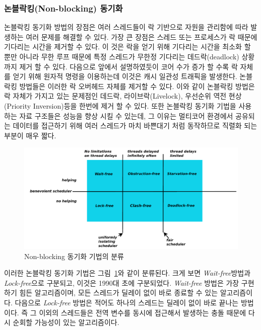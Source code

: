 \subsubsection{논블락킹(Non-blocking) 동기화}

논블락킹 동기화 방법의 장점은 여러 스레드들이 락 기반으로 자원을 관리함에 따라 
발생하는 여러 문제를 해결할 수 있다.
가장 큰 장점은 스레드 또는 프로세스가 락 때문에 기다리는 시간을 제거할 수 있다.
이 것은 락을 얻기 위해 기다리는 시간을 최소화 할 뿐만 아니라 무한 루프 때문에 특정 스레드가 무한정 기다리는 
데드락(deadlock) 상황까지 제거 할 수 있다. 
다음으로 앞에서 설명하였듯이 코어 수가 증가 할 수록 락 자체를 얻기 위해 원자적 명령을 이용하는데 이것은 
캐시 일관성 트래픽을 발생한다. 
논블락킹 방법들은 이러한 락 오버헤드 자체를 제거할 수 있다. 
이와 같이 논블락킹 방법은 락 자체가 가지고 있는 문제점인 데드락, 라이브락(Livelock), 
우선순위 역전 현상(Priority Inversion)등을 한번에 제거 할 수 있다. 
또한 논블락킹 동기화 기법을 사용하는  자료 구조들은 성능을 향상 시킬 수 있는데, 
그 이유는 멀티코어 환경에서 공유되는 데이터를 접근하기 위해 여러 스레드가 마치 바쁜대기 처럼 동작하므로 
직렬화 되는 부분이 매우 짧다.

\begin{figure}[h!]
    \centering
    \includegraphics[width=1\textwidth]{fig/NBS/NBS}
    \caption{Non-blocking 동기화 기법의 분류}
  \label{fig:NBS}
\end{figure}


이러한 논블락킹 동기화 기법은 그림~\ref{fig:NBS}와 같이 분류된다.
크게 보면 \textit{Wait-free}방법과 \textit{Lock-free}으로 구분되고, 이것은 1990대 초에 구분되었다.  
\textit{Wait-free} 방법은 가장 구현하기 힘든 알고리즘이며, 모든 스레드가 딜레이 없이 바로 종료할 수 
있는 알고리즘이다. 
다음으로 \textit{Lock-free} 방법은 적어도 하나의 스레드는 딜레이 없이 바로 끝나는 방법이다. 
즉 그 이외의 스레드들은 전역 변수를 동시에 접근해서 발생하는 충돌 때문에 다시 순회할 가능성이 있는 
알고리즘이다.

